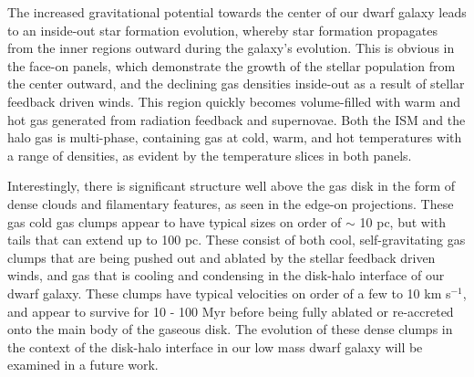 \documentclass[twocolumn]{aastex61}
\begin{document}
The increased gravitational potential towards the center of our dwarf galaxy leads to an inside-out star formation evolution, whereby star formation propagates from the inner regions outward during the galaxy's evolution. This is obvious in the face-on panels, which demonstrate the growth of the stellar population from the center outward, and the declining gas densities inside-out as a result of stellar feedback driven winds. This region quickly becomes volume-filled with warm and hot gas generated from radiation feedback and supernovae. Both the ISM and the halo gas is multi-phase, containing gas at cold, warm, and hot temperatures with a range of densities, as evident by the temperature slices in both panels. 

Interestingly, there is significant structure well above the gas disk in the form of dense clouds and filamentary features, as seen in the edge-on projections. These gas cold gas clumps appear to have typical sizes on order of $\sim$ 10 pc, but with tails that can extend up to 100 pc. These consist of both cool, self-gravitating gas clumps that are being pushed out and ablated by the stellar feedback driven winds, and gas that is cooling and condensing in the disk-halo interface of our dwarf galaxy. These clumps have typical velocities on order of a few to 10 km s$^{-1}$, and appear to survive for 10 - 100 Myr before being fully ablated or re-accreted onto the main body of the gaseous disk. The evolution of these dense clumps in the context of the disk-halo interface in our low mass dwarf galaxy will be examined in a future work. 
\end{document}
